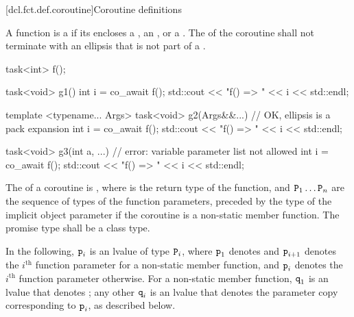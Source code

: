 [dcl.fct.def.coroutine]{Coroutine definitions}%
%

\pnum
A function is a  if its  encloses a
,
an ,
or a .
The  of the coroutine shall not
terminate with an ellipsis that is not part of
a .

\pnum
\begin{example}
\begin{codeblock}
task<int> f();

task<void> g1() {
  int i = co_await f();
  std::cout << "f() => " << i << std::endl;
}

template <typename... Args>
task<void> g2(Args&&...) {      // OK, ellipsis is a pack expansion
  int i = co_await f();
  std::cout << "f() => " << i << std::endl;
}

task<void> g3(int a, ...) {     // error: variable parameter list not allowed
  int i = co_await f();
  std::cout << "f() => " << i << std::endl;
}
\end{codeblock}
\end{example}

\pnum
{}%
The  of a coroutine is
,
where
 is the return type of the function, and
$\texttt{P}_1 \dotsc \texttt{P}_n$ are the sequence of types of the function parameters,
preceded by the type of the implicit object parameter
if the coroutine is a non-static member function.
The promise type shall be a class type.

\pnum
In the following, $\texttt{p}_i$ is an lvalue of type $\texttt{P}_i$,
where
$\texttt{p}_1$ denotes  and
$\texttt{p}_{i+1}$ denotes the $i^\textrm{th}$ function parameter
for a non-static member function, and
$\texttt{p}_i$ denotes
the $i^\textrm{th}$ function parameter otherwise.
For a non-static member function,
$\texttt{q}_1$ is an lvalue that denotes ;
any other $\texttt{q}_i$ is an lvalue
that denotes the parameter copy corresponding to $\texttt{p}_i$,
as described below.

